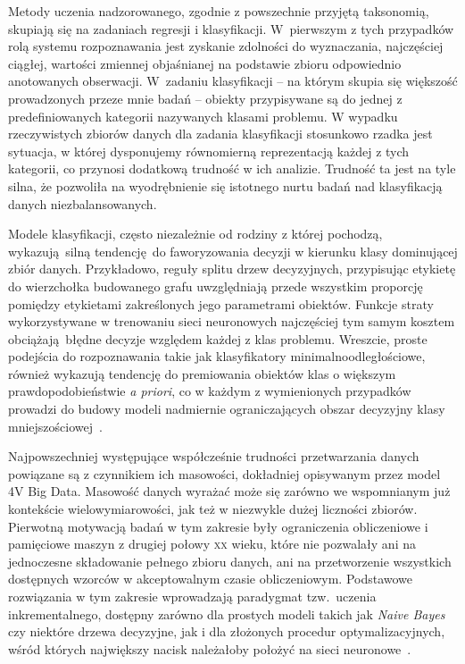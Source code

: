 Metody uczenia nadzorowanego, zgodnie z powszechnie przyjętą taksonomią, skupiają się na zadaniach regresji i klasyfikacji. W~pierwszym z tych przypadków rolą systemu rozpoznawania jest zyskanie zdolności do wyznaczania, najczęściej ciągłej, wartości zmiennej objaśnianej na podstawie zbioru odpowiednio anotowanych obserwacji. W~zadaniu klasyfikacji -- na którym skupia się większość prowadzonych przeze mnie badań -- obiekty przypisywane są do jednej z predefiniowanych kategorii nazywanych klasami problemu. W wypadku rzeczywistych zbiorów danych dla zadania klasyfikacji stosunkowo rzadka jest sytuacja, w której dysponujemy równomierną reprezentacją każdej z tych kategorii, co przynosi dodatkową trudność w ich analizie. Trudność ta jest na tyle silna, że pozwoliła na wyodrębnienie się istotnego nurtu badań nad klasyfikacją danych niezbalansowanych.

Modele klasyfikacji, często niezależnie od rodziny z której pochodzą, wykazują silną tendencję do faworyzowania decyzji w kierunku klasy dominującej zbiór danych. Przykładowo, reguły splitu drzew decyzyjnych, przypisując etykietę do wierzchołka budowanego grafu uwzględniają przede wszystkim proporcję pomiędzy etykietami zakreślonych jego parametrami obiektów. Funkcje straty wykorzystywane w trenowaniu sieci neuronowych najczęściej tym samym kosztem obciążają błędne decyzje względem każdej z klas problemu. Wreszcie, proste podejścia do rozpoznawania takie jak klasyfikatory minimalnoodległościowe, również wykazują tendencję do premiowania obiektów klas o większym prawdopodobieństwie \emph{a priori}, co w każdym z wymienionych przypadków prowadzi do budowy modeli nadmiernie ograniczających obszar decyzyjny klasy mniejszościowej~.

Najpowszechniej występujące współcześnie trudności przetwarzania danych powiązane są z czynnikiem ich masowości, dokładniej opisywanym przez model 4V Big Data. Masowość danych wyrażać może się zarówno we wspomnianym już kontekście wielowymiarowości, jak też w niezwykle dużej liczności zbiorów. Pierwotną motywacją badań w tym zakresie były ograniczenia obliczeniowe i pamięciowe maszyn z drugiej połowy \textsc{xx} wieku, które nie pozwalały ani na jednoczesne składowanie pełnego zbioru danych, ani na przetworzenie wszystkich dostępnych wzorców w akceptowalnym czasie obliczeniowym. Podstawowe rozwiązania w tym zakresie wprowadzają paradygmat tzw.~uczenia inkrementalnego, dostępny zarówno dla prostych modeli takich jak \emph{Naive Bayes} czy niektóre drzewa decyzyjne, jak i dla złożonych procedur optymalizacyjnych, wśród których największy nacisk należałoby położyć na sieci neuronowe~.

